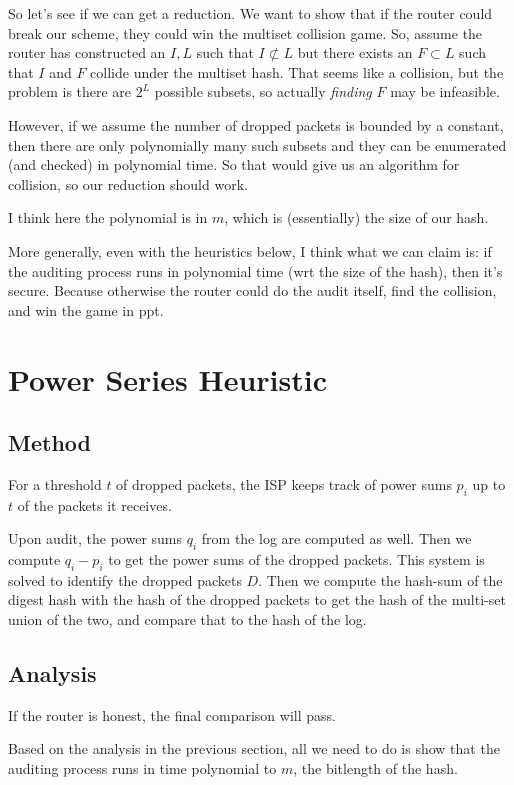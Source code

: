 \documentclass{article}
\begin{document}
So let's see if we can get a reduction. We want to show that if the router
could break our scheme, they could win the multiset collision game. So, assume
the router has constructed an $I, L$ such that $I \not\subset L$ but there
exists an $F \subset L$ such that $I$ and $F$ collide under the multiset hash.
That seems like a collision, but the problem is there are $2^L$ possible
subsets, so actually \emph{finding} $F$ may be infeasible.

However, if we assume the number of dropped packets is bounded by a constant,
then there are only polynomially many such subsets and they can be enumerated
(and checked) in polynomial time. So that would give us an algorithm for
collision, so our reduction should work.

I think here the polynomial is in $m$, which is (essentially) the size of our
hash.

More generally, even with the heuristics below, I think what we can claim is:
if the auditing process runs in polynomial time (wrt the size of the hash),
then it's secure. Because otherwise the router could do the audit itself, find
the collision, and win the game in ppt.

\section{Power Series Heuristic}
\subsection{Method}
For a threshold $t$ of dropped packets, the ISP keeps track of power sums $p_i$
up to $t$ of the packets it receives.

Upon audit, the power sums $q_i$ from the log are computed as well. Then we
compute $q_i - p_i$ to get the power sums of the dropped packets. This system
is solved to identify the dropped packets $D$. Then we compute the hash-sum of
the digest hash with the hash of the dropped packets to get the hash of the
multi-set union of the two, and compare that to the hash of the log.

\subsection{Analysis}
If the router is honest, the final comparison will pass.

Based on the analysis in the previous section, all we need to do is show that
the auditing process runs in time polynomial to $m$, the bitlength of the hash.
\end{document}
